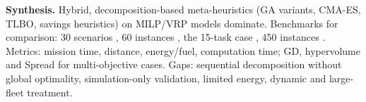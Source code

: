 \textbf{Synthesis.} Hybrid, decomposition-based meta-heuristics (GA variants, CMA-ES, TLBO, savings heuristics) on MILP/VRP models dominate. Benchmarks for comparison: 30 scenarios \cite{mondal}, 60 instances \cite{gao}, the 15-task case \cite{chen}, 450 instances \cite{wang}. Metrics: mission time, distance, energy/fuel, computation time; GD, hypervolume and Spread for multi-objective cases. Gaps: sequential decomposition without global optimality, simulation-only validation, limited energy, dynamic and large-fleet treatment.


